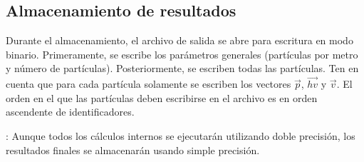 \subsection{Almacenamiento de resultados}

Durante el almacenamiento, el archivo de salida se abre para escritura
en modo binario. Primeramente, se escribe los parámetros generales (partículas
por metro y número de partículas). Posteriormente, se escriben todas las
partículas. Ten en cuenta que para cada partícula solamente se escriben los vectores
$\vec{p}$, $\overrightarrow{hv}$ y $\vec{v}$. El orden en el que las partículas
deben escribirse en el archivo es en orden ascendente de identificadores.

: 
Aunque todos los cálculos internos se ejecutarán utilizando doble precisión,
los resultados finales se almacenarán usando simple precisión.
